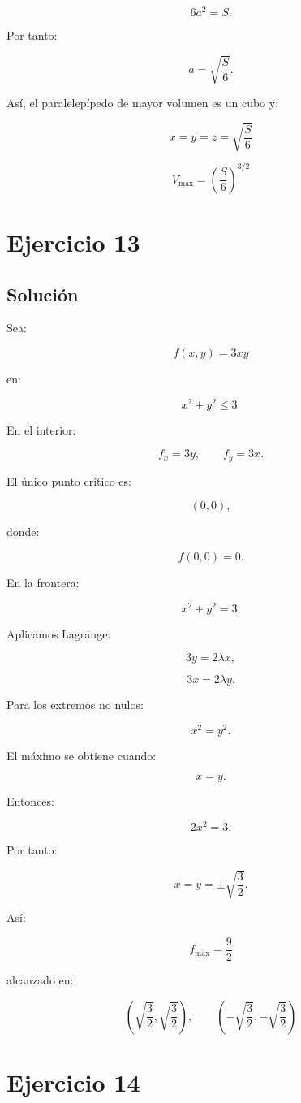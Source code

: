 \documentclass[11pt,a4paper]{article}
\begin{document}
\[
6a^2=S.
\]

Por tanto:

\[
a=\sqrt{\frac S6}.
\]

Así, el paralelepípedo de mayor volumen es un cubo y:

\[
\boxed{
x=y=z=\sqrt{\frac S6}
}
\]

\[
\boxed{
V_{\max}
=
\left(
\frac S6
\right)^{3/2}
}
\]

\section{Ejercicio 13}
\subsection{Solución}

Sea:

\[
f(x,y)=3xy
\]

en:

\[
x^2+y^2\leq3.
\]

En el interior:

\[
f_x=3y,
\qquad
f_y=3x.
\]

El único punto crítico es:

\[
(0,0),
\]

donde:

\[
f(0,0)=0.
\]

En la frontera:

\[
x^2+y^2=3.
\]

Aplicamos Lagrange:

\[
3y=2\lambda x,
\]

\[
3x=2\lambda y.
\]

Para los extremos no nulos:

\[
x^2=y^2.
\]

El máximo se obtiene cuando:

\[
x=y.
\]

Entonces:

\[
2x^2=3.
\]

Por tanto:

\[
x=y=\pm\sqrt{\frac32}.
\]

Así:

\[
\boxed{
f_{\max}
=
\frac92
}
\]

alcanzado en:

\[
\boxed{
\left(
\sqrt{\frac32},
\sqrt{\frac32}
\right),
\qquad
\left(
-\sqrt{\frac32},
-\sqrt{\frac32}
\right)
}
\]

\section{Ejercicio 14}
\end{document}
